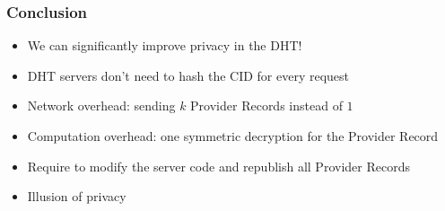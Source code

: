 \documentclass{pl-slide}
\begin{document}
\begin{frame}
\end{frame}

\begin{frame}
\frametitle{Conclusion}
\begin{itemize}
	\item We can significantly improve privacy in the DHT!
	\item DHT servers don't need to hash the CID for every request
	\item Network overhead: sending $k$ Provider Records instead of $1$
	\item Computation overhead: one symmetric decryption for the Provider Record
	\item Require to modify the server code and republish all Provider Records
	\item Illusion of privacy
\end{itemize}
\end{frame}

\end{document}
